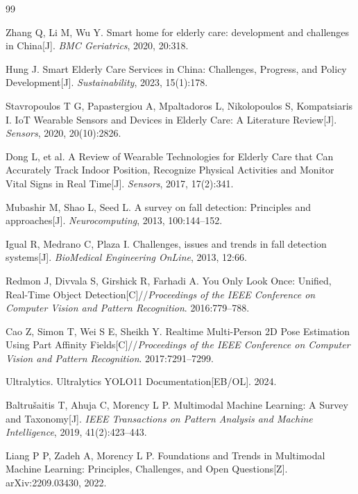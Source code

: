 \documentclass[UTF8,a4paper,zihao=-4,fontset=fandol]{ctexart}
\begin{document}
{}
\begin{thebibliography}{99}
\songti{}

Zhang Q, Li M, Wu Y. Smart home for elderly care: development and challenges in China[J]. \textit{BMC Geriatrics}, 2020, 20:318.

Hung J. Smart Elderly Care Services in China: Challenges, Progress, and Policy Development[J]. \textit{Sustainability}, 2023, 15(1):178.

Stavropoulos T G, Papastergiou A, Mpaltadoros L, Nikolopoulos S, Kompatsiaris I. IoT Wearable Sensors and Devices in Elderly Care: A Literature Review[J]. \textit{Sensors}, 2020, 20(10):2826.

Dong L, et al. A Review of Wearable Technologies for Elderly Care that Can Accurately Track Indoor Position, Recognize Physical Activities and Monitor Vital Signs in Real Time[J]. \textit{Sensors}, 2017, 17(2):341.

Mubashir M, Shao L, Seed L. A survey on fall detection: Principles and approaches[J]. \textit{Neurocomputing}, 2013, 100:144--152.

Igual R, Medrano C, Plaza I. Challenges, issues and trends in fall detection systems[J]. \textit{BioMedical Engineering OnLine}, 2013, 12:66.

Redmon J, Divvala S, Girshick R, Farhadi A. You Only Look Once: Unified, Real-Time Object Detection[C]//\textit{Proceedings of the IEEE Conference on Computer Vision and Pattern Recognition}. 2016:779--788.

Cao Z, Simon T, Wei S E, Sheikh Y. Realtime Multi-Person 2D Pose Estimation Using Part Affinity Fields[C]//\textit{Proceedings of the IEEE Conference on Computer Vision and Pattern Recognition}. 2017:7291--7299.

Ultralytics. Ultralytics YOLO11 Documentation[EB/OL]. 2024.

Baltrušaitis T, Ahuja C, Morency L P. Multimodal Machine Learning: A Survey and Taxonomy[J]. \textit{IEEE Transactions on Pattern Analysis and Machine Intelligence}, 2019, 41(2):423--443.

Liang P P, Zadeh A, Morency L P. Foundations and Trends in Multimodal Machine Learning: Principles, Challenges, and Open Questions[Z]. arXiv:2209.03430, 2022.


\end{thebibliography}
\end{document}
